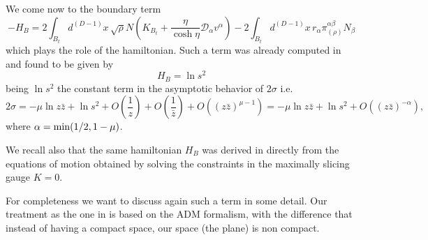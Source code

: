 \documentclass[a4paper,12pt]{article}
\begin{document}
We come now to the boundary term 
\begin{equation}\label{bound2}
-H_B= 2 \int_{B_t} d^{(D-1)}x
\,\sqrt{\rho} N \left( K_{B_t}+\frac{\eta}{\cosh\eta}
\mathcal{D}_\alpha
v^\alpha\right) -2 \int_{B_t} d^{(D-1)}x\, r_\alpha
\pi^{\alpha\beta}_{(\rho)} N_\beta 
\end{equation}
which plays the role of the
hamiltonian. Such a term was already computed in \cite{CMS1} and found
to be given by
\begin{equation}
H_B = \ln s^2
\end{equation}
being $\ln s^2$ the constant term in the asymptotic behavior of
$2\sigma$ i.e.
\begin{equation}\label{asymptoticsigma}
2\sigma = -\mu \ln z\bar z + \ln s^2 + O(\frac{1}{z})+O(\frac{1}{\bar
z}) + O((z\bar 
z)^{\mu-1}) = -\mu \ln z\bar z + \ln s^2 + O((z \bar z)^{-\alpha}), 
\end{equation}
where $\alpha={\rm min}(1/2,1-\mu)$. 

We recall also that the
same hamiltonian $H_B$ was derived in \cite{CMS1} directly from
the equations of motion obtained by solving the constraints in the
maximally slicing gauge $K=0$.

For completeness we want to
discuss again such a term in some detail. Our treatment as the one in
\cite{carlip} is based on the ADM formalism, with the difference that
instead of having a compact space, our space (the plane) is non
compact. 
\end{document}
